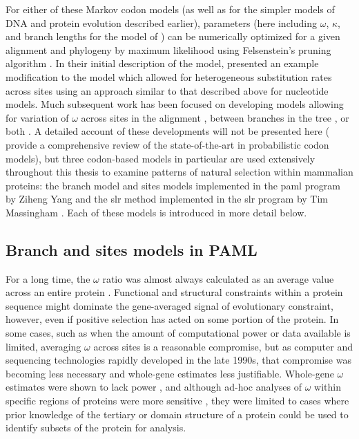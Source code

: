 For either of these Markov codon models (as well as for the simpler
models of DNA and protein evolution described earlier), parameters
(here including $\omega$, $\kappa$, and branch lengths for the model
of \citet{Goldman1994a}) can be numerically optimized for a given
alignment and phylogeny by maximum likelihood using Felsenstein's
pruning algorithm \citep{Felsenstein1981a,Goldman1994a,Yang2000c}. In
their initial description of the model, \citet{Goldman1994a} presented
an example modification to the model which allowed for heterogeneous
substitution rates across sites using an approach similar to that
described above for nucleotide models. Much subsequent work has been
focused on developing models allowing for variation of $\omega$ across
sites in the alignment
\citep{Nielsen1998,Yang2000CodonSubstitution,Yang2002,
  Wong2004,Yang2005Bayes,Massingham2005}, between branches in the tree
\citep{Yang1998a}, or both \citep{Yang2002b,Zhang2005}.  A detailed
account of these developments will not be presented here
(\citet{Anisimova2009} provide a comprehensive review of the
state-of-the-art in probabilistic codon models), but three codon-based
models in particular are used extensively throughout this thesis to
examine patterns of natural selection within mammalian proteins: the
branch model and sites models implemented in the \ac{paml} program by
Ziheng Yang \citep{Yang2007PAML} and the \ac{slr} method implemented
in the \ac{slr} program by Tim Massingham \citep{Massingham2005}. Each
of these models is introduced in more detail below.

\subsection{Branch and sites models in PAML}

For a long time, the $\omega$ ratio was almost always calculated as an
average value across an entire protein \citep{Sharp1997}. Functional
and structural constraints within a protein sequence might dominate
the gene-averaged signal of evolutionary constraint, however, even if
positive selection has acted on some portion of the protein. In some
cases, such as when the amount of computational power or data
available is limited, averaging $\omega$ across sites is a reasonable
compromise, but as computer and sequencing technologies rapidly
developed in the late 1990s, that compromise was becoming less
necessary and whole-gene estimates less justifiable. Whole-gene
$\omega$ estimates were shown to lack power \citep{Endo1996}, and
although ad-hoc analyses of $\omega$ within specific regions of proteins
were more sensitive \citep{Hughes1988}, they were limited to cases
where prior knowledge of the tertiary or domain structure of a protein
could be used to identify subsets of the protein for analysis.

